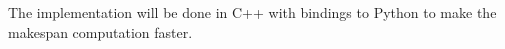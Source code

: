 The implementation will be done in C++ with bindings to Python to make
the makespan computation faster.

